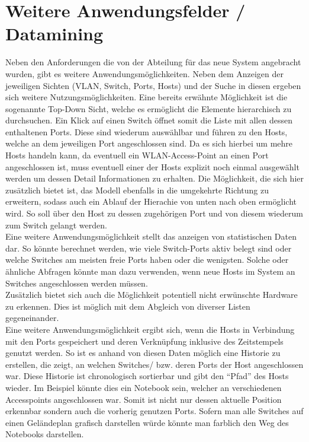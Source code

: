 \section{Weitere Anwendungsfelder / Datamining}
\label{sec:otherthoughts}

Neben den Anforderungen die von der Abteilung für das neue System angebracht wurden, gibt es weitere Anwendungsmöglichkeiten. Neben dem Anzeigen der jeweiligen Sichten (VLAN, Switch, Ports, Hosts) und der Suche in diesen ergeben sich weitere Nutzungsmöglichkeiten. Eine bereits erwähnte Möglichkeit ist die sogenannte Top-Down Sicht, welche es ermöglicht die Elemente hierarchisch zu durchsuchen. Ein Klick auf einen Switch öffnet somit die Liste mit allen dessen enthaltenen Ports. Diese sind wiederum auswählbar und führen zu den Hosts, welche an dem jeweiligen Port angeschlossen sind. Da es sich hierbei um mehre Hosts handeln kann, da eventuell ein WLAN-Access-Point an einen Port angeschlossen ist, muss eventuell einer der Hosts explizit noch einmal ausgewählt werden um dessen Detail Informationen zu erhalten. Die Möglichkeit, die sich hier zusätzlich bietet ist, das Modell ebenfalls in die umgekehrte Richtung zu erweitern, sodass auch ein Ablauf der Hierachie von unten nach oben ermöglicht wird. So soll über den Host zu dessen zugehörigen Port und von diesem wiederum zum Switch gelangt werden.\\
Eine weitere Anwendungsmöglichkeit stellt das anzeigen von statistischen Daten dar.
So könnte berechnet werden, wie viele Switch-Ports aktiv belegt sind oder welche Switches am meisten freie Ports haben oder die wenigsten. Solche oder ähnliche Abfragen könnte man dazu verwenden, wenn neue Hosts im System an Switches angeschlossen werden müssen.\\ Zusätzlich bietet sich auch die Möglichkeit potentiell nicht erwünschte Hardware zu erkennen.  Dies ist möglich mit dem Abgleich von diverser Listen gegeneinander.\\
Eine weitere Anwendungsmöglichkeit ergibt sich, wenn die Hosts in Verbindung mit den Ports gespeichert und deren Verknüpfung inklusive des Zeitstempels genutzt werden.
So ist es anhand von diesen Daten möglich eine Historie zu erstellen, die zeigt, an welchen Switches/ bzw. deren Ports der Host angeschlossen war. Diese Historie ist chronologisch sortierbar und gibt den “Pfad” des Hosts wieder. Im Beispiel könnte dies ein Notebook sein, welcher an verschiedenen Accesspoints angeschlossen war. Somit ist nicht nur dessen aktuelle Position erkennbar sondern auch die vorherig genutzen Ports. Sofern man alle Switches auf einen Geländeplan grafisch darstellen würde könnte man farblich den Weg des Notebooks darstellen.
